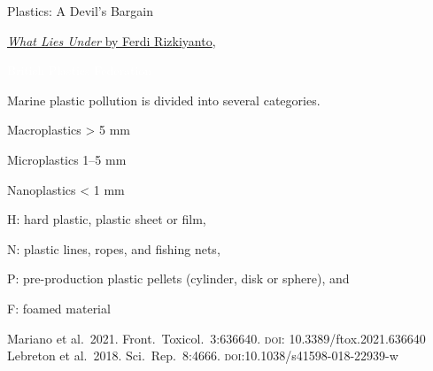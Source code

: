 \documentclass[t]{beamer}
\begin{document}

{
\begin{frame}[b]{Plastics: A Devil's Bargain}

	\tinynofill \href{https://ferdi-rizkiyanto.blogspot.com/2011/06/what-lies-under.html}{\textit{What Lies Under} by Ferdi Rizkiyanto}, \ccbync{} 
\end{frame}
}
%
{
\begin{frame}

\tinyfill \textcolor{white}{British Plastics Federation}
\end{frame}
}
%
\begin{frame}{Marine plastic pollution is divided into several categories.}
\vspace{-\baselineskip}

\begin{multicols}{2}

\quad {}

\hangpara Macroplastics > 5 mm

\hangpara Microplastics 1–5 mm

\hangpara Nanoplastics < 1 mm

\columnbreak


\hangpara H: hard plastic, plastic sheet or film,

\hangpara N: plastic lines, ropes, and fishing nets,

\hangpara P: pre-production plastic pellets (cylinder, disk or sphere), and

\hangpara F: foamed material

\end{multicols}

\vfilll

\tiny Mariano et al.~2021. Front.~Toxicol.~3:636640. \textsc{doi}: 10.3389/ftox.2021.636640 \\ Lebreton et al.~2018. Sci.\ Rep.\ 8:4666. \textsc{doi}:10.1038/s41598-018-22939-w
\end{frame}
%

{
\begin{frame}

\end{frame}
}
%
{
\begin{frame}

\end{frame}
}
%
{
\begin{frame}

\end{frame}
}
%
\end{document}
